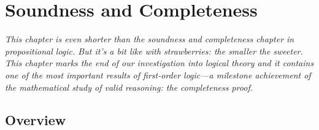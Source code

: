 \chapter{Soundness and Completeness}

\emph{This chapter is even shorter than the soundness and completeness
  chapter in propositional logic. But it's a bit like with strawberries:
  the smaller the sweeter. This chapter marks the end of our
  investigation into logical theory and it contains one of the most
  important results of first-order logic---a milestone achievement of
  the mathematical study of valid reasoning: the completeness
  proof.}

\section{Overview}

